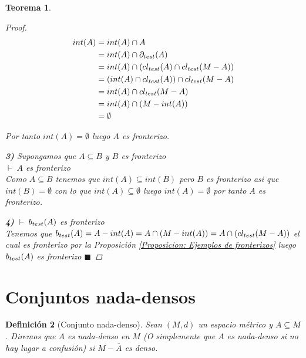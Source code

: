 \documentclass[oneside]{book} %
\theoremstyle{Teorema}
\newtheorem{Definicion}{Definición}[chapter]
\newtheorem{Teorema}[Definicion]{Teorema}
\theoremstyle{Ejemplos}
\theoremstyle{[Obs]}
\def \test {test}
\newcommand{\cerradura}[2][\test]{\ifx \test #1 {\overline{#2}} \else {cl_{#1}(#2)} \fi} %
\newcommand{\frontera}[2][\test]{\ifx \test #1 {\partial(#2)} \else {\partial_{#1}(#2)} \fi} %
\newcommand{\borde}[2][\test]{\ifx \test #1 {b(#2)} \else {b_{#1}(#2)} \fi} %
\renewcommand{\{}{\left\lbrace} %
\renewcommand{\}}{\right\rbrace} %
\newcommand{\n}{\cap} %
\renewcommand{\sc}{\subseteq} %
\renewcommand{\qed}{$\blacksquare$} %
\newcommand{\pd}{$\vdash\ $} %
\begin{document}
\begin{Teorema}
\begin{proof}
					\begin{align*}
						int(A) &= int(A) \n A \\ 
						&= int(A) \n \frontera{A} \\ 
						&= int(A) \n (\cerradura{A} \n \cerradura{M - A}) \\ 
						&= (int(A) \n \cerradura{A}) \n \cerradura{M - A} \\ 
						&= int(A) \n \cerradura{M - A} \\ 
						&= int(A) \n (M - int(A)) \\ 
						&= \emptyset
					\end{align*}

					Por tanto $int(A) = \emptyset$ luego $A$ es fronterizo.

					\textbf{3)} Supongamos que $A \sc B$ y $B$ es fronterizo \\ 
					\pd $A$ es fronterizo \\
					Como $A \sc B$ tenemos que $int(A) \sc int(B)$ pero $B$ es fronterizo asi que $int(B) = \emptyset$ con lo que $int(A) \sc \emptyset$ luego $int(A) = \emptyset$ por tanto $A$ es fronterizo.

					\textbf{4)} \pd $\borde{A}$ es fronterizo \\
					Tenemos que $\borde{A} = A - int(A) = A \n (M - int(A)) = A \n (\cerradura{M - A})$ el cual es fronterizo por la Proposición \ref{Proposicion: Ejemplos de fronterizos} luego $\borde{A}$ es fronterizo \qed 

				\end{proof}
			
			\end{Teorema}

		\section{Conjuntos nada-densos}

			\begin{Definicion}[Conjunto nada-denso]\setlength{\parindent}{0em}
				
				Sean $(M, d)$ un espacio métrico y $A \sc M$. Diremos que $A$ es nada-denso en $M$ (O simplemente que $A$ es nada-denso si no hay lugar a confusión) si $M - \overline{A}$ es denso. 

			\end{Definicion}
\end{document}
